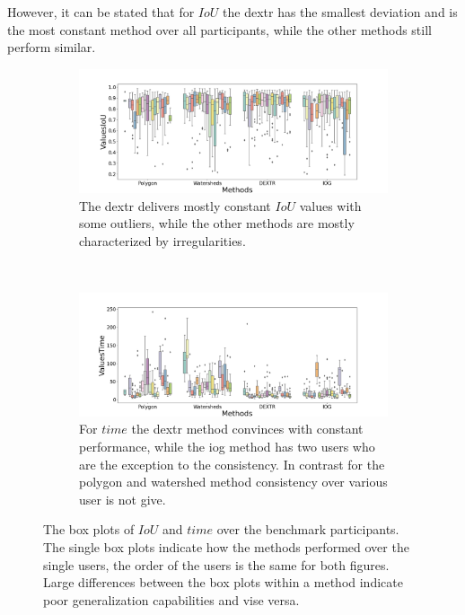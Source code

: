 However, it can be stated that for $IoU$ the \gls{dextr} has the smallest deviation and is the most constant method over all participants, while the other methods still perform similar.

\begin{figure} [h!]
	\centering
	\begin{subfigure}[t]{1.0\textwidth}
		\centering
		\includegraphics[width=\textwidth]{figures/chap53_all_users_iou.png}
		\caption{
			The \gls{dextr} delivers mostly constant $ IoU $ values with some outliers, while the other methods are mostly characterized by irregularities.
		}\label{fig:ch5:sec3:all_benchmark_iou}
	\end{subfigure}
	\\
	\begin{subfigure}[t]{1.0\textwidth}
		\centering
		\includegraphics[width=\textwidth]{figures/chap53_all_users_time.png}
		\caption{
			For $ time $ the \gls{dextr} method convinces with constant performance, while the \gls{iog} method has two users who are the exception to the consistency.
			In contrast for the polygon and watershed method consistency over various user is not give.			
		} \label{fig:ch5:sec3:all_benchmark_time}
	\end{subfigure}
	\caption[Box plots of benchmark participants on $ IoU $ and $ time$.]{		
		The box plots of $ IoU $ and $ time $ over the \getNumberBenchmarkParticipants \space benchmark participants.
		The single box plots indicate how the methods performed over the single users, the order of the users is the same for both figures. 
		Large differences between the box plots within a method indicate poor generalization capabilities and vise versa.
	}\label{fig:ch5:sec3:all_benchmark}
\end{figure}

